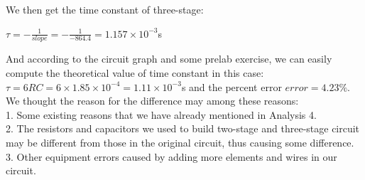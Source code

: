 \phantom{ } We then get the time constant of three-stage: 
\begin{center}
	$\tau = -\frac{1}{slope} = -\frac{1}{-864.4} = 1.157\times10^{-3}$s
\end{center}

And according to the circuit graph and some prelab exercise, we can easily compute
the theoretical value of time constant in this case:
$\tau = 6RC = 6\times1.85\times10^{-4} = 1.11\times10^{-3}$s and the percent error $error = 4.23\%$.\\
\phantom{ } We thought the reason for the difference may among these reasons:\\
1. Some existing reasons that we have already mentioned in Analysis 4.\\
2. The resistors and capacitors we used to build two-stage and three-stage circuit may be different from those in the original circuit, thus causing some difference.\\
3. Other equipment errors caused by adding more elements and wires in our circuit.\\

